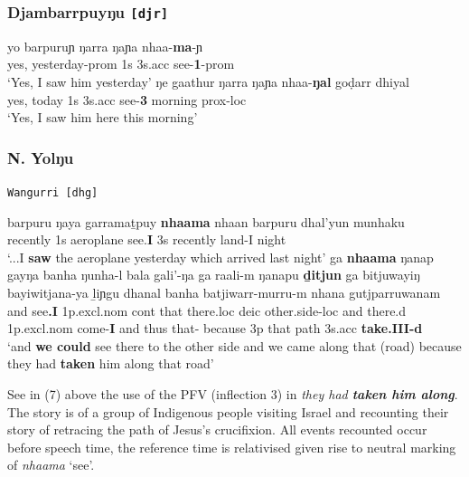 \documentclass[11pt]{article}
\begin{document}
\subsubsection*{Djambarrpuyŋu {\tt[djr]}}
\begin{exe}
\ex\gll yo barpuruɲ ŋarra ŋaɲa nhaa-\textbf{ma}-ɲ\\
yes, yesterday{\sc-prom} 1s 3s{\sc.acc} see-\textbf{1}-{\sc prom}\\
\glt`Yes, I saw him yesterday'
\ex\gll ŋe gaathur ŋarra ŋaɲa nhaa-\textbf{ŋal} goḍarr dhiyal\\
yes, today 1s 3s{\sc.acc} see-\textbf{3} morning {\sc prox-loc}\\
\glt`Yes, I saw him here this morning'
\end{exe}


\subsubsection*{N. Yolŋu} {\tt Wangurri [dhg]}
\begin{exe}
\ex\gll barpuru ŋaya garramaṯpuy \textbf{nhaama} nhaan  barpuru dhal'yun munhaku\\
recently 1s aeroplane see.\textbf{I} 3s recently land-I night\\
\glt`...I \textbf{saw} the aeroplane  yesterday which arrived last night'
\ex\gll ga \textbf{nhaama} ŋanap gayŋa banha ŋunha-l bala gali'-ŋa ga raali-m ŋanapu \textbf{ḏitjun} ga bitjuwayiŋ bayiwitjana-ya ḻiɲgu dhanal banha batjiwarr-murru-m nhana gutjparruwanam\\
and see\textbf{.I} 1p.excl.nom {\sc cont} that there{\sc.loc} {\sc deic} other.side{\sc-loc} and there.d 1p.excl.nom come-\textbf{I} and thus that- because 3p that path 3s.acc \textbf{take{\sc.III-d}}\\
\glt`and \textbf{we could }see there to the other side and we came along that (road) because they had \textbf{taken} him along that road'
\end{exe}

See in (7) above the use of the PFV (inflection 3) in \textit{they had \textbf{taken him along}}. The story is of a group of Indigenous people visiting Israel and recounting their story of retracing the path of Jesus's crucifixion. All events recounted occur before speech time, the reference time is relativised given rise to neutral marking of \textit{nhaama} `see'.
 
\end{document}
